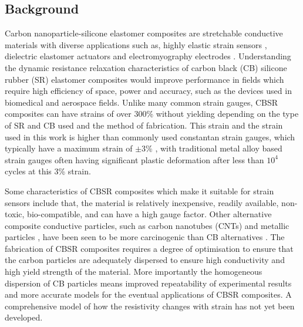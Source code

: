 \subsection{Background}
Carbon nanoparticle-silicone elastomer composites are stretchable conductive materials with diverse applications such as, highly elastic strain sensors \cite{Lacasse2010,Spahr2017,Kim2018}, dielectric elastomer actuators \cite{Henke2018,Liu2009} and electromyography electrodes \cite{Carpi2010,Kim2018,Mouri2019}. Understanding the dynamic resistance relaxation characteristics of carbon black (CB) silicone rubber (SR) elastomer composites would improve performance in fields which require high efficiency of space, power and accuracy, such as the devices used in biomedical and aerospace fields. Unlike many common strain gauges, CBSR composites can have strains of over 300\% without yielding \cite{Wang2010} depending on the type of SR and CB used and the method of fabrication. This strain and the strain used in this work is higher than commonly used constantan strain gauges, which typically have a maximum strain of $\pm 3$\% \cite{VishayPG2018}, with traditional metal alloy based strain gauges often having significant plastic deformation after less than $10^4$ cycles \cite{VishayPG2018} at this 3\% strain.


Some characteristics of CBSR composites which make it suitable for strain sensors include that, the material is relatively inexpensive, readily available, non-toxic, bio-compatible, and can have a high gauge factor. Other alternative composite conductive particles, such as carbon nanotubes (CNTs) \cite{Maddipatla2017,Wang2013} and metallic particles \cite{Quinsaat2015,Racles2021}, have been seen to be more carcinogenic than CB alternatives \cite{Fukushima2018,Ferdous2020,Rausch2004}. The fabrication of CBSR composites requires a degree of optimisation to ensure that the carbon particles are adequately dispersed to ensure high conductivity and high yield strength of the material. More importantly the homogeneous dispersion of CB particles means improved repeatability of experimental results and more accurate models for the eventual applications of CBSR composites. A comprehensive model of how the resistivity changes with strain has not yet been developed. 

